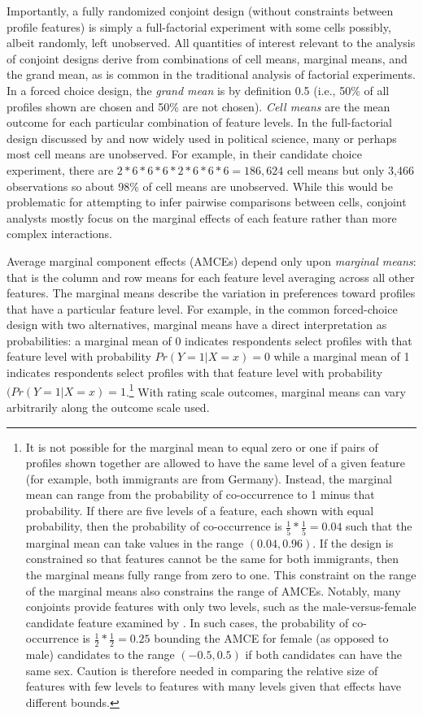 \documentclass[a4paper,12pt]{article}\usepackage[]{graphicx}\usepackage[]{color}
\begin{document}
Importantly, a fully randomized conjoint design (without constraints between profile features) is simply a full-factorial experiment with some cells possibly, albeit randomly, left unobserved. All quantities of interest relevant to the analysis of conjoint designs derive from combinations of cell means, marginal means, and the grand mean, as is common in the traditional analysis of factorial experiments. In a forced choice design, the \textit{grand mean} is by definition 0.5 (i.e., 50\% of all profiles shown are chosen and 50\% are not chosen). \textit{Cell means} are the mean outcome for each particular combination of feature levels. In the full-factorial design discussed by \citet{HainmuellerHopkinsYamamoto2014} and now widely used in political science, many or perhaps most cell means are unobserved. For example, in their candidate choice experiment, there are $2*6*6*6*2*6*6*6 = 186,624$ cell means but only 3,466 observations so about 98\% of cell means are unobserved. While this would be problematic for attempting to infer pairwise comparisons between cells, conjoint analysts mostly focus on the marginal effects of each feature rather than more complex interactions.

Average marginal component effects (AMCEs) depend only upon \textit{marginal means}: that is the column and row means for each feature level averaging across all other features. The marginal means describe the variation in preferences toward profiles that have a particular feature level. For example, in the common forced-choice design with two alternatives, marginal means have a direct interpretation as probabilities: a marginal mean of 0 indicates respondents select profiles with that feature level with probability $Pr(Y=1|X=x) = 0$ while a marginal mean of 1 indicates respondents select profiles with that feature level with probability $(Pr(Y=1|X=x)=1$.\footnote{It is not possible for the marginal mean to equal zero or one if pairs of profiles shown together are allowed to have the same level of a given feature (for example, both immigrants are from Germany). Instead, the marginal mean can range from the probability of co-occurrence to 1 minus that probability. If there are five levels of a feature, each shown with equal probability, then the probability of co-occurrence is $\frac{1}{5}*\frac{1}{5} = 0.04$ such that the marginal mean can take values in the range $(0.04,0.96)$. If the design is constrained so that features cannot be the same for both immigrants, then the marginal means fully range from zero to one. This constraint on the range of the marginal means also constrains the range of AMCEs. Notably, many conjoints provide features with only two levels, such as the male-versus-female candidate feature examined by \citet{TeeleKallaRosenbluth2018}. In such cases, the probability of co-occurrence is $\frac{1}{2}*\frac{1}{2} = 0.25$ bounding the AMCE for female (as opposed to male) candidates to the range $(-0.5, 0.5)$ if both candidates can have the same sex. Caution is therefore needed in comparing the relative size of features with few levels to features with many levels given that effects have different bounds.} With rating scale outcomes, marginal means can vary arbitrarily along the outcome scale used.
\end{document}
